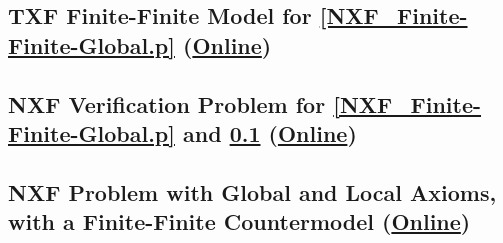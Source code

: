 \documentclass{easychair}
\begin{document}
\newpage
\subsection{TXF Finite-Finite Model for \ref{NXF_Finite-Finite-Global.p}
(\href{https://raw.githubusercontent.com/GeoffsPapers/InterpretationFormat/master/Examples/NXF_Finite-Finite-Global.s}{Online})}
\label{NXF_Finite-Finite-Global.s}
\begin{small}

\end{small}

\newpage
\subsection{NXF Verification Problem for \ref{NXF_Finite-Finite-Global.p} and 
\ref{NXF_Finite-Finite-Global.s}
(\href{https://raw.githubusercontent.com/GeoffsPapers/InterpretationFormat/master/Examples/NXF_Finite-Finite-Global.s.p}{Online})}
\label{NXF_Finite-Finite-Global.s.p}
\begin{small}

\end{small}

% 

\newpage
\subsection{NXF Problem with Global and Local Axioms, \\
            with a Finite-Finite Countermodel
(\href{https://raw.githubusercontent.com/GeoffsPapers/InterpretationFormat/master/Examples/NXF_Finite-Finite-Local.p}{Online})}
\label{NXF_Finite-Finite-Local.p}
\begin{small}

\end{small}
\end{document}
